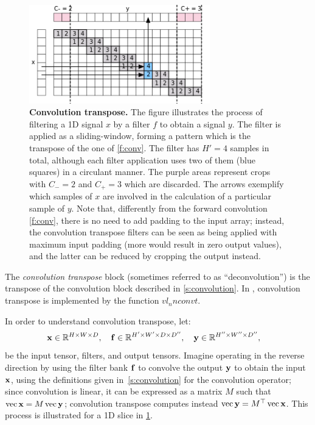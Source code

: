 \begin{figure}[t]
	\centering
	\includegraphics[width=0.7\textwidth]{figures/svg/convt}
	\caption{\textbf{Convolution transpose.} The figure illustrates the process of filtering a 1D signal $x$ by a filter $f$ to obtain a signal $y$. The filter is applied as a sliding-window, forming a pattern which is the transpose of the one of \cref{f:conv}. The filter has $H'=4$ samples in total, although each filter application uses two of them (blue squares) in a circulant manner. The purple areas represent crops with $C_-=2$ and $C_+=3$ which are discarded. The arrows exemplify which samples of $x$ are involved in the calculation of a particular sample of $y$. Note that, differently from the forward convolution \cref{f:conv}, there is no need to add padding to the input array; instead, the convolution transpose filters can be seen as being applied with maximum input padding (more would result in zero output values), and the latter can be reduced by cropping the output instead.}\label{f:convt}
\end{figure}

The \emph{convolution transpose} block (sometimes referred to as ``deconvolution'') is the transpose of the convolution block described in \cref{s:convolution}. In \matconvnet, convolution transpose is  implemented by the function $vl_nnconvt$.

In order to understand convolution transpose, let:
\[
\mathbf{x}\in\mathbb{R}^{H \times W \times D}, \quad
\mathbf{f}\in\mathbb{R}^{H' \times W' \times D \times D''}, \quad
\mathbf{y}\in\mathbb{R}^{H'' \times W'' \times D''}, \quad
\]
be the input tensor, filters, and output tensors. Imagine operating in the reverse direction by using the filter bank $\mathbf{f}$ to convolve the output $\mathbf{y}$ to obtain the input $\mathbf{x}$, using the definitions given in~\cref{s:convolution} for the convolution operator; since convolution is linear, it can be expressed as a matrix $M$ such that  $\operatorname{vec} \mathbf{x} = M \operatorname{vec}\mathbf{y}$; convolution transpose computes instead $\operatorname{vec} \mathbf{y} = M^\top \operatorname{vec} \mathbf{x}$. This process is illustrated for a 1D slice in \cref{f:convt}.

